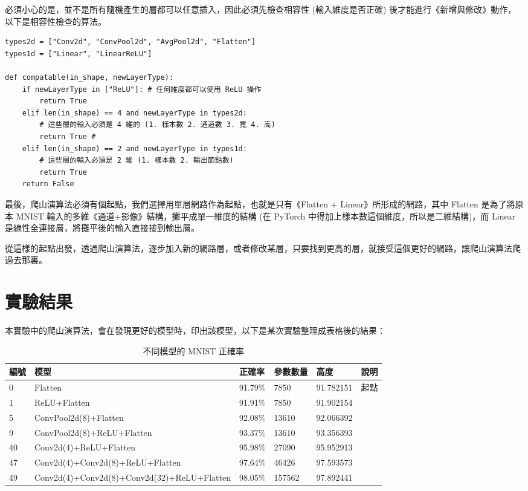 \documentclass{article}
\begin{document}
必須小心的是，並不是所有隨機產生的層都可以任意插入，因此必須先檢查相容性 (輸入維度是否正確) 後才能進行《新增與修改》動作，以下是相容性檢查的算法。

\begin{minipage}{\linewidth}
\begin{lstlisting}
types2d = ["Conv2d", "ConvPool2d", "AvgPool2d", "Flatten"]
types1d = ["Linear", "LinearReLU"]

def compatable(in_shape, newLayerType):
    if newLayerType in ["ReLU"]: # 任何維度都可以使用 ReLU 操作
        return True
    elif len(in_shape) == 4 and newLayerType in types2d:
        # 這些層的輸入必須是 4 維的 (1. 樣本數 2. 通道數 3. 寬 4. 高)
        return True # 
    elif len(in_shape) == 2 and newLayerType in types1d:
        # 這些層的輸入必須是 2 維 (1. 樣本數 2. 輸出節點數)
        return True
    return False
\end{lstlisting}
\end{minipage}

最後，爬山演算法必須有個起點，我們選擇用單層網路作為起點，也就是只有《Flatten + Linear》所形成的網路，其中 Flatten 是為了將原本 MNIST 輸入的多維《通道+影像》結構，攤平成單一維度的結構 (在 PyTorch 中得加上樣本數這個維度，所以是二維結構)，而 Linear 是線性全連接層，將攤平後的輸入直接接到輸出層。

從這樣的起點出發，透過爬山演算法，逐步加入新的網路層，或者修改某層，只要找到更高的層，就接受這個更好的網路，讓爬山演算法爬過去那裏。

\section{實驗結果}

本實驗中的爬山演算法，會在發現更好的模型時，印出該模型，以下是某次實驗整理成表格後的結果：

\begin{table}
 \caption{不同模型的 MNIST 正確率}
  \centering
  \begin{tabular}{llllll}
    編號 & 模型     & 正確率     & 參數數量 & 高度    & 說明 \\
    \midrule
    0  & Flatten & 91.79\% & 7850 & 91.782151 & 起點\\
    1   & ReLU+Flatten & 91.91\% & 7850 & 91.902154  \\
    5   & ConvPool2d(8)+Flatten & 92.08\% & 13610 & 92.066392 \\
    9   & ConvPool2d(8)+ReLU+Flatten & 93.37\% & 13610 & 93.356393      \\
    40  & Conv2d(4)+ReLU+Flatten & 95.98\% & 27090 & 95.952913       \\
    47  & Conv2d(4)+Conv2d(8)+ReLU+Flatten & 97.64\% & 46426 & 97.593573       \\
    49  & Conv2d(4)+Conv2d(8)+Conv2d(32)+ReLU+Flatten & 98.05\% & 157562 & 97.892441 \\
    \bottomrule
  \end{tabular}
  \label{table:experiment1}
\end{table}
\end{document}
